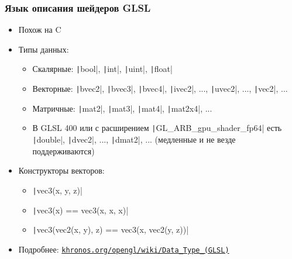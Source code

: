 \documentclass[10pt]{beamer}
\begin{document}
\begin{frame}[fragile]
\frametitle{Язык описания шейдеров GLSL}
\begin{itemize}
\item Похож на C
\pause
\item Типы данных:
\pause
\begin{itemize}
\item Скалярные: \texttt|bool|, \texttt|int|, \texttt|uint|, \texttt|float|
\pause
\item Векторные: \texttt|bvec2|, \texttt|bvec3|, \texttt|bvec4|, \texttt|ivec2|, ..., \texttt|uvec2|, ..., \texttt|vec2|, ...
\pause
\item Матричные: \texttt|mat2|, \texttt|mat3|, \texttt|mat4|, \texttt|mat2x4|, ...
\pause
\item В GLSL 400 или с расширением \texttt|GL_ARB_gpu_shader_fp64| есть \texttt|double|, \texttt|dvec2|, ..., \texttt|dmat2|, ... \pause (медленные и не везде поддерживаются)
\end{itemize}
\pause
\item Конструкторы векторов:
\pause
\begin{itemize}
\item \texttt|vec3(x, y, z)|
\pause
\item \texttt|vec3(x) == vec3(x, x, x)|
\pause
\item \texttt|vec3(vec2(x, y), z) == vec3(x, vec2(y, z))|
\end{itemize}
\pause
\item Подробнее: \href{https://www.khronos.org/opengl/wiki/Data_Type_(GLSL)}{\nolinkurl{khronos.org/opengl/wiki/Data\_Type\_(GLSL)}}
\end{itemize}
\end{frame}
\end{document}
